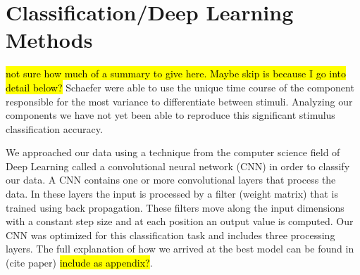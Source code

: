 \chapter*{Classification/Deep Learning Methods}
\hl{not sure how much of a summary to give here. Maybe skip is because I go into detail below?}
Schaefer \etal \cite{schaefer_name_2011} were able to use the unique time course of the component responsible for the most variance to differentiate between stimuli.
Analyzing our components we have not yet been able to reproduce this significant stimulus classification accuracy. 
 
We approached our data using a technique from the computer science field of Deep Learning called a convolutional neural network (\ac{CNN}) in order to classify our data.
A \ac{CNN} contains one or more convolutional layers that process the data.
In these layers the input is processed by a filter (weight matrix) that is trained using back propagation. 
These filters move along the input dimensions with a constant step size and at each position an output value is computed.
Our \ac{CNN} was optimized for this classification task and includes three processing layers.
The full explanation of how we arrived at the best model can be found in (cite paper) \hl{include as appendix?}.


